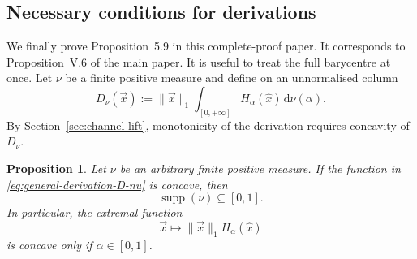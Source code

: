 \documentclass[aps,pra,11pt,onecolumn,nofootinbib,tightenlines]{revtex4-2}
\newtheorem{proposition}[theorem]{Proposition}
\theoremstyle{definition}
\begin{document}
\subsection{Necessary conditions for derivations}
\label{sec:derivation-necessity}

We finally prove Proposition~5.9 in this complete-proof paper. It corresponds
to Proposition~V.6 of the main paper. It is useful to treat the full
barycentre at once. Let $\nu$ be a finite positive measure and define on an unnormalised column
\begin{equation}
 D_\nu(\vec x)
 :=\|\vec x\|_1
   \int_{[0,+\infty]}H_\alpha(\widehat x)\,\mathrm d\nu(\alpha).
 \label{eq:general-derivation-D-nu}
\end{equation}
By Section~\ref{sec:channel-lift}, monotonicity of the derivation requires concavity of $D_\nu$.

\begin{proposition}
\label{prop:derivation-necessary}
Let $\nu$ be an arbitrary finite positive measure. If the function in \eqref{eq:general-derivation-D-nu} is concave, then
\begin{equation}
 \operatorname{supp}(\nu)\subseteq[0,1].
 \label{eq:derivation-support-necessary}
\end{equation}
In particular, the extremal function
\begin{equation}
 \vec x\longmapsto
 \|\vec x\|_1H_\alpha(\widehat x)
 \label{eq:extremal-derivation-column}
\end{equation}
 is concave only if $\alpha\in[0,1]$.
\end{proposition}
\end{document}
